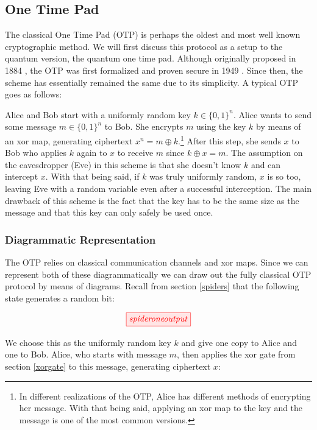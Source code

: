 \documentclass[]{article}
\begin{document}
\subsection{One Time Pad}

The classical One Time Pad (OTP) is perhaps the oldest and most well known cryptographic method. We will first discuss this protocol as a setup to the quantum version, the quantum one time pad. Although originally proposed in 1884 \cite{Markoff2011}, the OTP was first formalized and proven secure in 1949 \cite{Shannon1949}. Since then, the scheme has essentially remained the same due to its simplicity. A typical OTP goes as follows:

Alice and Bob start with a uniformly random key $k \in \{0,1\}^n$. Alice wants to send some message $m \in \{0,1\}^n$ to Bob. She encrypts $m$ using the key $k$ by means of an xor map, generating ciphertext $x^n = m \oplus k$.\footnote{In different realizations of the OTP, Alice has different methods of encrypting her message. With that being said, applying an xor map to the key and the message is one of the most common versions.} After this step, she sends $x$ to Bob who applies $k$ again to $x$ to receive $m$ since $k \oplus x = m$. The assumption on the eavesdropper (Eve) in this scheme is that she doesn't know $k$ and can intercept $x$. With that being said, if $k$ was truly uniformly random, $x$ is so too, leaving Eve with a random variable even after a successful interception. The main drawback of this scheme is the fact that the key has to be the same size as the message and that this key can only safely be used once.

\subsubsection{Diagrammatic Representation}

The OTP relies on classical communication channels and xor maps. Since we can represent both of these diagrammatically we can draw out the fully classical OTP protocol by means of diagrams. Recall from section \ref{spiders} that the following state generates a random bit:

\begin{equation}
	\tikzfig{spideroneoutput}
\end{equation}

We choose this as the uniformly random key $k$ and give one copy to Alice and one to Bob. Alice, who starts with message $m$, then applies the xor gate from section \ref{xorgate} to this message, generating ciphertext $x$:
\end{document}
